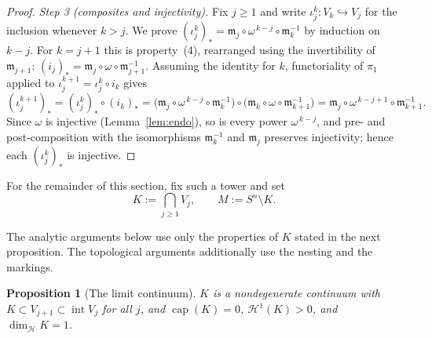 \documentclass[12pt,oneside,a4paper]{article}
\newtheorem{proposition}[definition]{Proposition}
\theoremstyle{mytheorem}
\theoremstyle{remark}
\theoremstyle{definition}
\begin{document}
\begin{proof}
\smallskip\noindent\emph{Step 3 (composites and injectivity).}
Fix $j\ge1$ and write $\iota_j^k:V_k\hookrightarrow V_j$ for the inclusion whenever
$k>j$. We prove $(\iota_j^k)_*=\mathfrak{m}_j\circ\omega^{\,k-j}\circ\mathfrak{m}_k^{-1}$ by
induction on $k-j$. For $k=j+1$ this is property~(4), rearranged using the
invertibility of $\mathfrak{m}_{j+1}$: $(i_j)_*=\mathfrak{m}_j\circ\omega\circ\mathfrak{m}_{j+1}^{-1}$.
Assuming the identity for $k$, functoriality of $\pi_1$ applied to
$\iota_j^{k+1}=\iota_j^{k}\circ i_k$ gives
\[
(\iota_j^{k+1})_*
=(\iota_j^{k})_*\circ(i_k)_*
=\bigl(\mathfrak{m}_j\circ\omega^{\,k-j}\circ\mathfrak{m}_k^{-1}\bigr)\circ
 \bigl(\mathfrak{m}_k\circ\omega\circ\mathfrak{m}_{k+1}^{-1}\bigr)
=\mathfrak{m}_j\circ\omega^{\,k-j+1}\circ\mathfrak{m}_{k+1}^{-1}.
\]
Since $\omega$ is injective (Lemma~\ref{lem:endo}), so is every power
$\omega^{\,k-j}$, and pre- and post-composition with the isomorphisms
$\mathfrak{m}_k^{-1}$ and $\mathfrak{m}_j$ preserves injectivity; hence each $(\iota_j^k)_*$ is
injective.
\end{proof}



For the remainder of this section, fix such a tower and set
\[
 K:=\bigcap_{j\geq1}V_j,
 \qquad
 M:=S^n\setminus K.
\]

The analytic arguments below use only the properties of $K$ stated in the
next proposition.  The topological arguments additionally use the nesting
and the markings.

\begin{proposition}[The limit continuum]\label{prop:limitset}
$K$ is a nondegenerate continuum with
$K\subset V_{j+1}\subset\operatorname{int}V_j$ for all $j$, and
$\operatorname{cap}(K)=0$, $\mathcal{H}^1(K)>0$, and
$\dim_{\mathcal{H}}K=1$.
\end{proposition}
\end{document}
